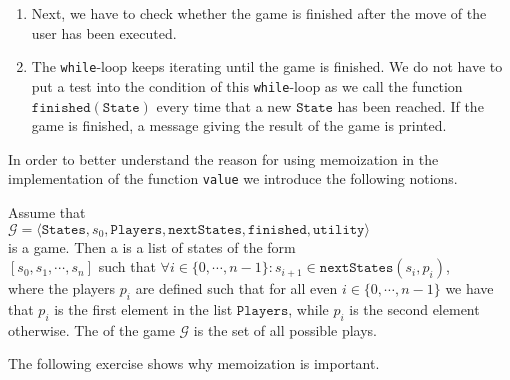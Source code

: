\begin{enumerate}
\begin{enumerate}
      \item Next, we have to check whether the game is finished after the  move of the user has been executed.
      \item The \texttt{while}-loop keeps iterating until the game is finished.
            We do not have to put a test into the condition of this \texttt{while}-loop as we call the function
            $\texttt{finished}(\texttt{State})$ every time that a new $\texttt{State}$ has been reached.
            If the game is finished, a message giving the result of the game is printed.
      \end{enumerate}
\end{enumerate}
In order to better understand the reason for using memoization in the implementation of the function
\texttt{value} we introduce the following notions.
\begin{Definition}
  Assume that
  \\[0.2cm]
  \hspace*{1.3cm}
  $\mathcal{G} = \langle \texttt{States}, s_0, \texttt{Players}, \texttt{nextStates}, \texttt{finished},\texttt{utility} \rangle$
  \\[0.2cm]
  is a game. Then a  is a list of states of the form 
  \\[0.2cm]
  \hspace*{1.3cm}
  $[s_0, s_1, \cdots, s_n]$ \quad such that \quad $\forall i\in\{0,\cdots,n-1\}: s_{i+1} \in \texttt{nextStates}(s_i, p_i)$,
  \\[0.2cm]
  where the players $p_i$ are defined such that for all even $i\in\{0,\cdots,n-1\}$ we have that $p_i$ is the
  first element in the list $\texttt{Players}$, while $p_i$ is the second element otherwise.
  The  of the game $\mathcal{G}$ is the set of all possible plays.  \eoxs
\end{Definition}

\noindent
The following exercise shows why memoization is important.

